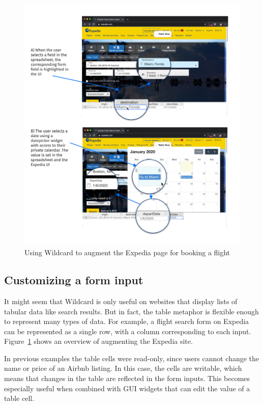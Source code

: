 \documentclass[english,submission]{programming}
\begin{document}
\begin{figure}
\hypertarget{fig:expedia-demo}{%
\centering
\includegraphics{media/expedia-demo-300dpi.png}
\caption{Using Wildcard to augment the Expedia page for booking a
flight}\label{fig:expedia-demo}
}
\end{figure}

\hypertarget{customizing-a-form-input}{%
\subsection{Customizing a form input}\label{customizing-a-form-input}}

It might seem that Wildcard is only useful on websites that display
lists of tabular data like search results. But in fact, the table
metaphor is flexible enough to represent many types of data. For
example, a flight search form on Expedia can be represented as a single
row, with a column corresponding to each input. {
Figure~\ref{fig:expedia-demo} shows an overview of augmenting the
Expedia site.}

In previous examples the table cells were read-only, since users cannot
change the name or price of an Airbnb listing. In this case, the cells
are writable, which means that changes in the table are reflected in the
form inputs. This becomes especially useful when combined with GUI
widgets that can edit the value of a table cell.
\end{document}
